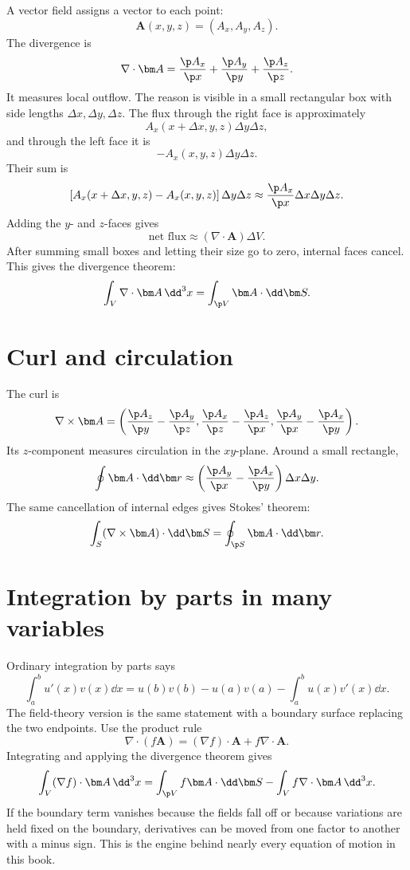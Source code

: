 A vector field assigns a vector to each point:
\[
  \bm A(x,y,z)=(A_x,A_y,A_z).
\]
The divergence is
\[
  \nabla\cdot \bm A
  =
  \frac{\p A_x}{\p x}
  +\frac{\p A_y}{\p y}
  +\frac{\p A_z}{\p z}.
\]
It measures local outflow.  The reason is visible in a small rectangular box with side lengths \(\Delta x,\Delta y,\Delta z\).  The flux through the right face is approximately
\[
  A_x(x+\Delta x,y,z)\Delta y\Delta z,
\]
and through the left face it is
\[
  -A_x(x,y,z)\Delta y\Delta z.
\]
Their sum is
\[
  \left[A_x(x+\Delta x,y,z)-A_x(x,y,z)\right]\Delta y\Delta z
  \approx
  \frac{\p A_x}{\p x}\Delta x\Delta y\Delta z.
\]
Adding the \(y\)- and \(z\)-faces gives
\[
  \text{net flux}
  \approx
  (\nabla\cdot \bm A)\Delta V.
\]
After summing small boxes and letting their size go to zero, internal faces cancel.  This gives the divergence theorem:
\[
  \int_V \nabla\cdot\bm A\,\dd^3x
  =
  \int_{\p V}\bm A\cdot \dd\bm S .
\]

\section{Curl and circulation}

The curl is
\[
  \nabla\times\bm A
  =
  \left(
  \frac{\p A_z}{\p y}-\frac{\p A_y}{\p z},
  \frac{\p A_x}{\p z}-\frac{\p A_z}{\p x},
  \frac{\p A_y}{\p x}-\frac{\p A_x}{\p y}
  \right).
\]
Its \(z\)-component measures circulation in the \(xy\)-plane.  Around a small rectangle,
\[
  \oint \bm A\cdot\dd\bm r
  \approx
  \left(\frac{\p A_y}{\p x}-\frac{\p A_x}{\p y}\right)\Delta x\Delta y.
\]
The same cancellation of internal edges gives Stokes' theorem:
\[
  \int_S(\nabla\times\bm A)\cdot\dd\bm S
  =
  \oint_{\p S}\bm A\cdot\dd\bm r .
\]

\section{Integration by parts in many variables}

Ordinary integration by parts says
\[
  \int_a^b u'(x)v(x)\dd x
  =
  u(b)v(b)-u(a)v(a)-\int_a^b u(x)v'(x)\dd x.
\]
The field-theory version is the same statement with a boundary surface replacing the two endpoints.  Use the product rule
\[
  \nabla\cdot(f\bm A)=(\nabla f)\cdot\bm A+f\nabla\cdot\bm A.
\]
Integrating and applying the divergence theorem gives
\[
  \int_V(\nabla f)\cdot\bm A\,\dd^3x
  =
  \int_{\p V}f\bm A\cdot\dd\bm S
  -\int_V f\nabla\cdot\bm A\,\dd^3x .
\]
If the boundary term vanishes because the fields fall off or because variations are held fixed on the boundary, derivatives can be moved from one factor to another with a minus sign.  This is the engine behind nearly every equation of motion in this book.

